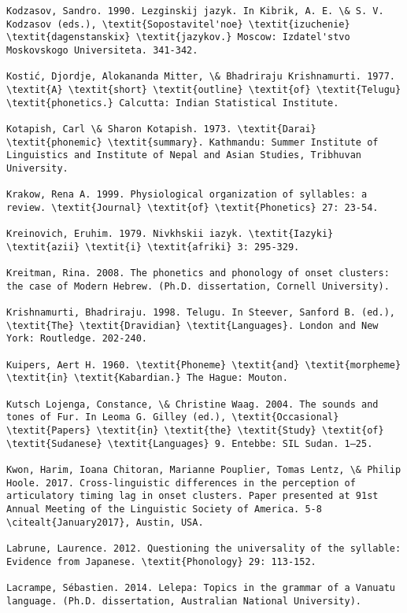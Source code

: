 \begin{verbatim}
Kodzasov, Sandro. 1990. Lezginskij jazyk. In Kibrik, A. E. \& S. V.  Kodzasov (eds.), \textit{Sopostavitel'noe} \textit{izuchenie} \textit{dagenstanskix} \textit{jazykov.} Moscow: Izdatel'stvo Moskovskogo Universiteta. 341-342.

Kostić, Djordje, Alokananda Mitter, \& Bhadriraju Krishnamurti. 1977. \textit{A} \textit{short} \textit{outline} \textit{of} \textit{Telugu} \textit{phonetics.} Calcutta: Indian Statistical Institute.

Kotapish, Carl \& Sharon Kotapish. 1973. \textit{Darai} \textit{phonemic} \textit{summary}. Kathmandu: Summer Institute of Linguistics and Institute of Nepal and Asian Studies, Tribhuvan University.

Krakow, Rena A. 1999. Physiological organization of syllables: a review. \textit{Journal} \textit{of} \textit{Phonetics} 27: 23-54.

Kreinovich, Eruhim. 1979. Nivkhskii iazyk. \textit{Iazyki} \textit{azii} \textit{i} \textit{afriki} 3: 295-329.

Kreitman, Rina. 2008. The phonetics and phonology of onset clusters: the case of Modern Hebrew. (Ph.D. dissertation, Cornell University).

Krishnamurti, Bhadriraju. 1998. Telugu. In Steever, Sanford B. (ed.), \textit{The} \textit{Dravidian} \textit{Languages}. London and New York: Routledge. 202-240.

Kuipers, Aert H. 1960. \textit{Phoneme} \textit{and} \textit{morpheme} \textit{in} \textit{Kabardian.} The Hague: Mouton.

Kutsch Lojenga, Constance, \& Christine Waag. 2004. The sounds and tones of Fur. In Leoma G. Gilley (ed.), \textit{Occasional} \textit{Papers} \textit{in} \textit{the} \textit{Study} \textit{of} \textit{Sudanese} \textit{Languages} 9. Entebbe: SIL Sudan. 1–25.

Kwon, Harim, Ioana Chitoran, Marianne Pouplier, Tomas Lentz, \& Philip Hoole. 2017. Cross-linguistic differences in the perception of articulatory timing lag in onset clusters. Paper presented at 91st Annual Meeting of the Linguistic Society of America. 5-8 \citealt{January2017}, Austin, USA.

Labrune, Laurence. 2012. Questioning the universality of the syllable: Evidence from Japanese. \textit{Phonology} 29: 113-152.

Lacrampe, Sébastien. 2014. Lelepa: Topics in the grammar of a Vanuatu language. (Ph.D. dissertation, Australian National University).


\end{verbatim}
